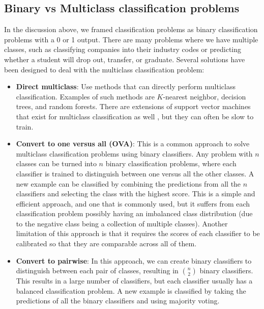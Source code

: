 \documentclass[]{krantz}
\begin{document}
\subsection{Binary vs Multiclass classification
problems}\label{binary-vs-multiclass-classification-problems}

In the discussion above, we framed classification problems as binary
classification problems with a 0 or 1 output. There are many problems
where we have multiple classes, such as classifying companies into their
industry codes or predicting whether a student will drop out, transfer,
or graduate. Several solutions have been designed to deal with the
multiclass classification problem:

\begin{itemize}
\item
  \textbf{Direct multiclass}: Use methods that can directly perform
  multiclass classification. Examples of such methods are \(K\)-nearest
  neighbor, decision trees, and random forests. There are extensions of
  support vector machines that exist for multiclass classification as
  well \citep{crammer2002}, but they can often be slow to train.
\item
  \textbf{Convert to one versus all (OVA)}: This is a common approach to
  solve multiclass classification problems using binary classifiers. Any
  problem with \(n\) classes can be turned into \(n\) binary
  classification problems, where each classifier is trained to
  distinguish between one versus all the other classes. A new example
  can be classified by combining the predictions from all the \(n\)
  classifiers and selecting the class with the highest score. This is a
  simple and efficient approach, and one that is commonly used, but it
  suffers from each classification problem possibly having an imbalanced
  class distribution (due to the negative class being a collection of
  multiple classes). Another limitation of this approach is that it
  requires the scores of each classifier to be calibrated so that they
  are comparable across all of them.
\item
  \textbf{Convert to pairwise}: In this approach, we can create binary
  classifiers to distinguish between each pair of classes, resulting in
  \(\binom{n}{2}\) binary classifiers. This results in a large number of
  classifiers, but each classifier usually has a balanced classification
  problem. A new example is classified by taking the predictions of all
  the binary classifiers and using majority voting.
\end{itemize}
\end{document}
